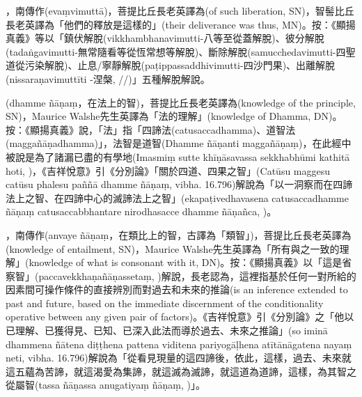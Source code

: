 \startitemgroup[noteitems]
\item{}，南傳作(evaṃvimuttā)，菩提比丘長老英譯為(of such liberation, SN)，智髻比丘長老英譯為「他們的釋放是這樣的」(their deliverance was thus, MN)。按：《顯揚真義》等以「鎮伏解脫(vikkhambhanavimutti-八等至從蓋解脫)、彼分解脫(tadaṅgavimutti-無常隨看等從恆常想等解脫)、斷除解脫(samucchedavimutti-四聖道從污染解脫)、止息/寧靜解脫(paṭippassaddhivimutti-四沙門果)、出離解脫(nissaraṇavimuttīti -涅槃, //)」五種解脫解說。
\stopitemgroup

\startitemgroup[noteitems]
\item{}(dhamme ñāṇaṃ，在法上的智)，菩提比丘長老英譯為(knowledge of the principle, SN)，Maurice Walshe先生英譯為「法的理解」(knowledge of Dhamma, DN)。按：《顯揚真義》說，「法」指「四諦法(catusaccadhamma)、道智法(maggañāṇadhamma)」，法智是道智(Dhamme ñāṇanti maggañāṇaṃ)，在此經中被說是為了諸漏已盡的有學地(Imasmiṃ sutte khīṇāsavassa sekkhabhūmi kathitā hoti, )，《吉祥悅意》引《分別論》「關於四道、四果之智」(Catūsu maggesu catūsu phalesu paññā dhamme ñāṇaṃ, vibha. 16.796)解說為「以一洞察而在四諦法上之智、在四諦中心的滅諦法上之智」(ekapaṭivedhavasena catusaccadhamme ñāṇaṃ catusaccabbhantare nirodhasacce dhamme ñāṇañca, )。
\stopitemgroup

\startitemgroup[noteitems]
\item{}，南傳作(anvaye ñāṇaṃ，在類比上的智，古譯為「類智」)，菩提比丘長老英譯為(knowledge of entailment, SN)，Maurice Walshe先生英譯為「所有與之一致的理解」(knowledge of what is consonant with it, DN)。按：《顯揚真義》以「這是省察智」(paccavekkhaṇañāṇassetaṃ, )解說，長老認為，這裡指基於任何一對所給的因素間可操作條件的直接辨別而對過去和未來的推論(is an inference extended to past and future, based on the immediate discernment of the conditionality operative between any given pair of factors)。《吉祥悅意》引《分別論》之「他以已理解、已獲得見、已知、已深入此法而導於過去、未來之推論」(so iminā dhammena ñātena diṭṭhena pattena viditena pariyogāḷhena atītānāgatena nayaṃ neti, vibha. 16.796)解說為「從看見現量的這四諦後，依此，這樣，過去、未來就這五蘊為苦諦，就這渴愛為集諦，就這滅為滅諦，就這道為道諦，這樣，為其智之從屬智(tassa ñāṇassa anugatiyaṃ ñāṇaṃ, )」。
\stopitemgroup

